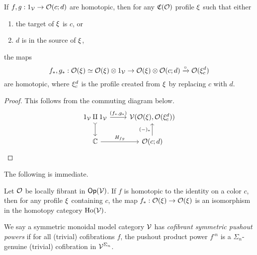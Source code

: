 \documentclass[a4paper,10pt
]{article}%
\renewcommand{\1}{\ensuremath{\mathbb{id}}}
\begin{document}
\begin{lemma}
      If $f,g: 1_{\mathcal V} \to \mathcal{O}(c;d)$ are homotopic, then for any $\mathfrak C(\mathcal{O})$ profile $\xi$ such that either
      \begin{enumerate}[label = (\roman*)]
      \item the target of $\xi$ is $c$, or
      \item $d$ is in the source of $\xi$,
      \end{enumerate}
      the maps
      \begin{equation}
            f_{\**}, g_{\**}: \O(\ksi) \simeq \O(\ksi) \otimes 1_\V \to \O(\ksi) \otimes \O(c;d) \xrightarrow{\circ} \O(\ksi_c^d)
      \end{equation}
      are homotopic,
      where $\xi_c^d$ is the profile created from $\xi$ by replacing $c$ with $d$.
\end{lemma}
\begin{proof}
      This follows from the commuting diagram below.
      \begin{equation}
            \begin{tikzcd}
                  1_\V \amalg 1_\V \arrow[r, "{(f_{\**}, g_{\**})}"] \arrow[d, tail]
                  &
                  \V(\O(\ksi), \O(\ksi_c^d))
                  \\
                  \mathbb C \arrow[r, "H_{fg}"]
                  &
                  \O(c;d) \arrow[u, "{(-)_{\**}}"]
            \end{tikzcd}
      \end{equation}
\end{proof}

The following is immediate.
\begin{corollary}
      \label{HTPIC_ISO_COR}
      Let $\mathcal{O}$ be locally fibrant in $\mathsf{Op}(\mathcal V)$. 
      If $f$ is homotopic to the identity on a color $c$, then for any profile $\xi$ containing $c$, the map
      $f_{\**}: \O(\ksi) \to \O(\ksi)$
     is an isomorphism in the homotopy category $\operatorname{Ho}(\mathcal V)$.
\end{corollary}




\begin{definition}[{cf. \cite[Defn 6.16]{BP17}}]
        We say a symmetric monoidal model category $\mathcal V$ has \textit{cofibrant symmetric pushout powers} if
        for all (trivial) cofibrations $f$, the pushout product power $f^{\square n}$
        is a $\Sigma_n$-genuine (trivial) cofibration in $\mathcal V^{\Sigma_n}$. 
\end{definition}
\end{document}

